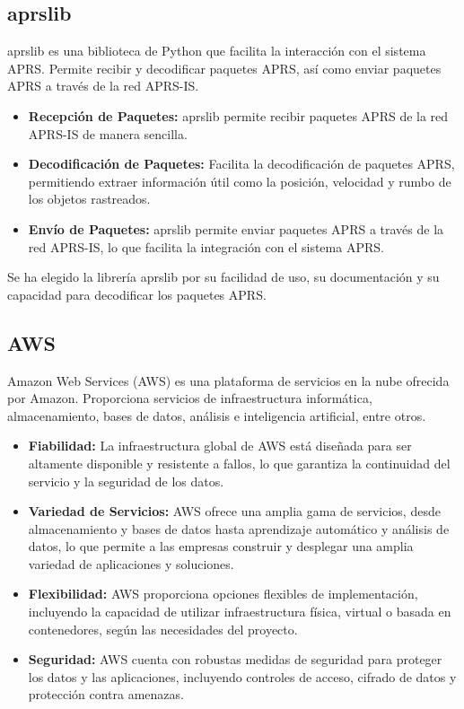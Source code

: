\subsection{aprslib}
aprslib es una biblioteca de Python que facilita la interacción con el sistema APRS. Permite recibir y decodificar paquetes APRS, así como enviar paquetes APRS a través de la red APRS-IS.
\begin{itemize}
	\item \textbf{Recepción de Paquetes:} aprslib permite recibir paquetes APRS de la red APRS-IS de manera sencilla.
	\item \textbf{Decodificación de Paquetes:} Facilita la decodificación de paquetes APRS, permitiendo extraer información útil como la posición, velocidad y rumbo de los objetos rastreados.
	\item \textbf{Envío de Paquetes:} aprslib permite enviar paquetes APRS a través de la red APRS-IS, lo que facilita la integración con el sistema APRS.
\end{itemize}
Se ha elegido la librería aprslib por su facilidad de uso, su documentación y su capacidad para decodificar los paquetes APRS.

\subsection{AWS}
Amazon Web Services (AWS) es una plataforma de servicios en la nube ofrecida por Amazon. Proporciona servicios de infraestructura informática, almacenamiento, bases de datos, análisis e inteligencia artificial, entre otros.

\begin{itemize}
	\item \textbf{Fiabilidad:} La infraestructura global de AWS está diseñada para ser altamente disponible y resistente a fallos, lo que garantiza la continuidad del servicio y la seguridad de los datos.
	\item \textbf{Variedad de Servicios:} AWS ofrece una amplia gama de servicios, desde almacenamiento y bases de datos hasta aprendizaje automático y análisis de datos, lo que permite a las empresas construir y desplegar una amplia variedad de aplicaciones y soluciones.
	\item \textbf{Flexibilidad:} AWS proporciona opciones flexibles de implementación, incluyendo la capacidad de utilizar infraestructura física, virtual o basada en contenedores, según las necesidades del proyecto.
	\item \textbf{Seguridad:} AWS cuenta con robustas medidas de seguridad para proteger los datos y las aplicaciones, incluyendo controles de acceso, cifrado de datos y protección contra amenazas.
\end{itemize}

